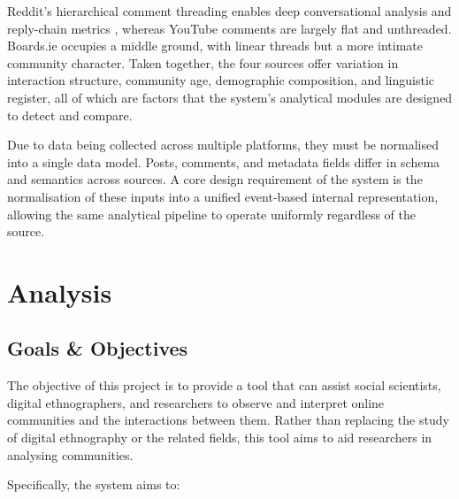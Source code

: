 \documentclass[12pt, a4paper]{article}
\begin{document}
Reddit's hierarchical comment threading enables deep conversational analysis and reply-chain metrics \cite{medvedev2019anatomy}, whereas YouTube comments are largely flat and unthreaded. Boards.ie occupies a middle ground, with linear threads but a more intimate community character. Taken together, the four sources offer variation in interaction structure, community age, demographic composition, and linguistic register, all of which are factors that the system's analytical modules are designed to detect and compare.

Due to data being collected across multiple platforms, they must be normalised into a single data model. Posts, comments, and metadata fields differ in schema and semantics across sources. A core design requirement of the system is the normalisation of these inputs into a unified event-based internal representation, allowing the same analytical pipeline to operate uniformly regardless of the source.

\newpage
\section{Analysis}
\subsection{Goals \& Objectives}
The objective of this project is to provide a tool that can assist social scientists, digital ethnographers, and researchers to observe and interpret online communities and the interactions between them. Rather than replacing the study of digital ethnography or the related fields, this tool aims to aid researchers in analysing communities.

Specifically, the system aims to: 
\end{document}
